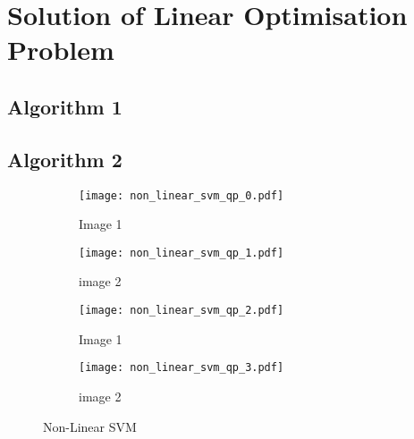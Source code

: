 \documentclass[10pt, a4paper,reqno]{amsart}
\begin{document}
\section{Solution of Linear Optimisation Problem}

\subsection{Algorithm 1}\hfill

\subsection{Algorithm 2}\hfill

\begin{figure}
	\centering	
	\begin{subfigure}{0.5\textwidth}
		\centering
		\texttt{[image: non\_linear\_svm\_qp\_0.pdf]}
		\caption{Image 1}
	\end{subfigure}%
	\begin{subfigure}{0.5\textwidth}
		\centering
		\texttt{[image: non\_linear\_svm\_qp\_1.pdf]}
		\caption{image 2}
	\end{subfigure}
	\begin{subfigure}{0.5\textwidth}
		\centering
		\texttt{[image: non\_linear\_svm\_qp\_2.pdf]}
		\caption{Image 1}
	\end{subfigure}%
	\begin{subfigure}{0.5\textwidth}
		\centering
		\texttt{[image: non\_linear\_svm\_qp\_3.pdf]}
		\caption{image 2}
	\end{subfigure}
	\caption{Non-Linear SVM}
\end{figure}
\end{document}
